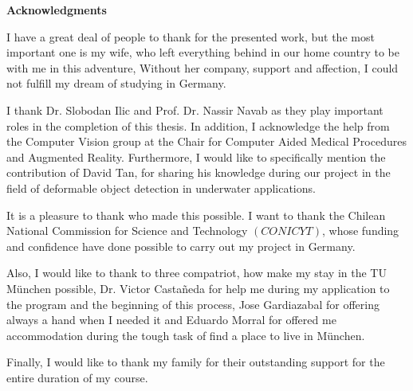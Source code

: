 \clearemptydoublepage
{}
{}	



\vspace*{2cm}

\begin{center}
{\Large \bf Acknowledgments}
\end{center}

\vspace{1cm}

I have a great deal of people to thank for the presented work, but the most important
one is my wife, who left everything behind in our home country to be with me in this
adventure, Without her company, support and affection, I could not fulfill
my dream of studying in Germany.

I thank Dr. Slobodan Ilic and Prof. Dr. Nassir Navab as they
play important roles in the completion of this thesis. In addition, I acknowledge the
help from the Computer Vision group at the Chair for Computer Aided Medical Procedures
and Augmented Reality. Furthermore, I would like to specifically mention the contribution
of David Tan, for sharing his knowledge during our project in the field of deformable
object detection in underwater applications.

It is a pleasure to  thank who made this possible. I want to thank the Chilean National
Commission for Science and Technology $(CONICYT)$, whose funding and confidence have
done possible to carry out my project in Germany.

Also, I would like to thank to three compatriot, how make my stay in the TU M{\"u}nchen possible, Dr. Victor Casta\~{n}eda for help me during my application to the program and
the beginning of this process, Jose Gardiazabal for offering always a hand 
when I needed it and Eduardo Morral for offered me accommodation during the tough task of 
find a place to live in M{\"u}nchen.
	
Finally, I would like to thank my family for their outstanding support for the entire
duration of my course.





